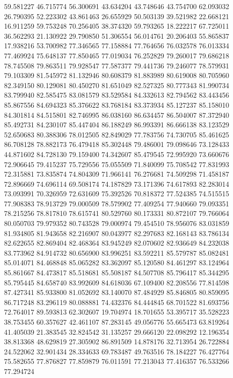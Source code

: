59.581227
46.715774
56.300691
43.634204
43.748646
43.754700
62.093032
26.790395
52.223302
43.861463
26.655929
50.503139
39.521982
22.668121
16.911259
59.753248
70.256405
38.374320
59.793265
18.222217
67.725011
36.562293
21.130922
29.790850
51.306554
56.014761
20.206403
55.865837
17.938216
53.700982
77.346565
77.158884
77.764656
76.032578
76.013334
77.469924
75.648137
77.850465
77.019034
76.252829
79.260017
79.686218
78.745508
79.863511
79.928547
77.587377
79.441736
79.246077
78.579931
79.103309
81.545972
81.132946
80.608379
81.883989
80.619008
80.705960
82.349150
80.129081
80.450270
81.651049
82.527325
80.777343
81.990734
83.799940
82.585475
83.081579
83.529584
84.332613
82.794562
83.443456
85.867556
84.694323
85.376622
83.768184
83.373934
85.127237
85.158010
84.301814
84.515801
82.746995
86.038160
86.634457
86.504007
87.372940
85.492731
84.230107
85.447404
86.188249
86.993391
86.666138
83.123529
52.650683
80.388306
78.012505
82.849029
77.783756
74.730705
85.461625
86.708128
78.882173
76.479418
85.302448
79.486001
79.098646
73.128433
44.871602
84.728130
79.159400
74.342607
85.479545
72.995920
73.660676
72.906645
79.415237
75.729556
75.055509
71.840099
75.708542
77.831993
72.315881
73.835874
74.804309
71.966141
76.276681
74.509298
71.458187
72.896669
74.696114
69.508174
74.187829
73.171396
74.617893
82.283014
73.093991
70.326959
72.631609
75.392526
70.818372
77.524385
74.515515
77.908383
78.913729
79.000509
78.579902
77.409254
77.940660
79.093351
78.215256
78.817810
78.615741
80.529760
80.173331
80.872107
79.766064
80.050703
79.979352
80.743528
79.000974
79.454510
78.956076
83.031859
81.934805
81.943658
82.216907
80.043977
82.297683
82.168143
83.786134
82.622655
82.869404
82.468364
83.945249
82.070602
82.936649
84.232038
83.773962
84.914732
80.656900
83.996251
83.592211
85.579787
85.082481
85.014071
84.468848
85.065282
83.362097
85.120580
84.461297
83.124964
85.861667
84.473817
85.518681
85.508187
84.507708
85.796417
85.344295
85.795445
84.658740
83.992609
84.618036
67.109400
82.208556
77.814598
87.427341
85.933800
81.052692
83.140070
87.484929
85.846805
80.859095
86.717248
83.296119
80.088881
74.432376
84.444845
68.701522
81.693756
72.764017
89.593813
62.302607
19.704974
18.701655
53.395717
35.528223
38.753455
60.357627
42.461107
87.283145
49.056776
55.665473
63.819264
41.405039
21.383545
32.824542
31.135257
29.666120
22.098292
12.196354
38.813368
48.629819
27.305902
86.891509
14.878176
32.713954
26.722884
24.522062
32.901434
28.334633
69.783487
49.763516
78.184227
76.427764
75.582655
77.876827
77.859879
76.011591
77.213043
77.416357
76.533266
77.294724

